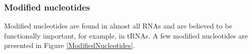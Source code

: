 \documentclass[12pt]{article}
\begin{document}
\subsubsection{Modified nucleotides}
Modified nucleotides are found in almost all RNAs and are believed to be functionally important, for example, in tRNAs. A few modified nucleotides are presented in Figure \ref{ModifiedNucleotides}. 
\begin{figure}[h!]
\centering
\begin{center}

\end{center}
\end{figure}
\end{document}
